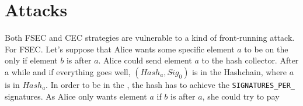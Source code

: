 \section{Attacks}\label{sec:attack}

Both FSEC and CEC strategies are vulnerable to a kind of front-running attack.
%
For FSEC.
%
Let's suppose that Alice wants some specific element $a$ to be on the \setchain only if element $b$
is after $a$. Alice could send element $a$ to the hash collector. After a while and if everything
goes well, $(Hash_a, Sig_0)$ is in the Hashchain, where $a$ is in $Hash_a$. In order to be in the
\setchain, the hash has to achieve the \texttt{SIGNATURES\_PER_\HASH} signatures. As Alice only wants
element $a$ if $b$ is after $a$, she could try to pay 
 
